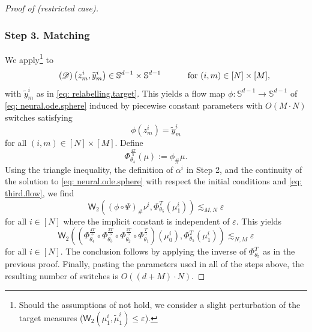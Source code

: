\documentclass[a4paper,11pt]{article}
\theoremstyle{plain}
\renewcommand{\S}{\mathbb{S}^{d-1}}
\renewcommand{\leq}{\leqslant}
\numberwithin{equation}{section}
\begin{document}
\begin{proof}[Proof of  (restricted case)]
     
     \subsubsection*{Step 3. Matching} 
     We apply\footnote{Should the assumptions of  not hold, we consider a slight perturbation of the target measures ($\mathsf{W}_2(\mu_1^i,\tilde{\mu}_1^i)\leq \varepsilon$).}  to
     \begin{equation} \tag{$\mathscr{D}$}
     \left(z_m^i, \widetilde{y}_m^i\right)\in\S\times\S \hspace{1cm} \text{ for } (i, m)\in[N]\times[M],
     \end{equation}
     with $\widetilde{y}_m^i$ as in \eqref{eq: relabelling.target}. This yields a flow map $\phi:\S\to\S$ of \eqref{eq: neural.ode.sphere} induced by piecewise constant parameters with $O(M\cdot N)$ switches satisfying
     \begin{equation*}
         \phi(z_m^i)=\widetilde{y}_m^i
     \end{equation*}
     for all $(i, m)\in[N]\times[M]$. 
     Define
    \begin{equation*}
         \Phi^{\frac{4T}{5}}_{\theta_4}(\mu):=\phi_\#\mu.
     \end{equation*}
     Using the triangle inequality, the definition of $\alpha^i$ in Step 2, and the continuity of the solution to \eqref{eq: neural.ode.sphere} with respect the initial conditions and \eqref{eq: third.flow}, we find 
     \begin{equation*}
\mathsf{W}_2\left((\phi\circ\Psi)_{\#}\nu^i,\Phi_{\theta_5}^T(\mu_1^i)\right)\lesssim_{M, N}\varepsilon
     \end{equation*}
     for all $i\in[N]$ where the implicit constant is independent of $\varepsilon$. This yields
               \begin{equation*} 
         \mathsf{W}_2\left(\left(\Phi_{\theta_4}^{\frac{4T}{5}}\circ\Phi^{\frac{3T}{5}}_{\theta_3}\circ \Phi^{\frac{2T}{5}}_{\theta_2}\circ\Phi^{\frac{T}{5}}_{\theta_1}\right)(\mu_0^i),\Phi_{\theta_5}^{T}(\mu_1^i)\right)\lesssim_{N, M}\varepsilon
     \end{equation*}
     for all $i\in[N]$.
     The conclusion follows by applying the inverse of $\Phi^T_{\theta_5}$ as in the previous proof. Finally, pasting the parameters used in all of the steps above, the resulting number of switches is $O((d+M)\cdot N)$. 
\end{proof}
\end{document}
